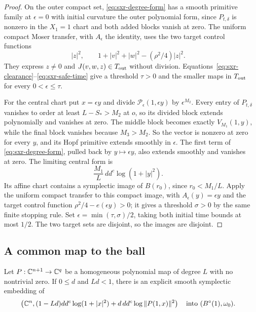 \begin{proof}
On the outer compact set, \eqref{eq:sxr-degree-form} has a smooth primitive family at $\epsilon=0$
with initial curvature the outer polynomial form, since $P_{t,\delta}$ is nonzero in the $X_1=1$
chart and both added blocks vanish at zero. The uniform compact Moser transfer, with $A_\epsilon$ the identity,
uses the two target control functions
\[
 |z|^2,\qquad 1+|v|^2+|w|^2-(\rho^2/4)|z|^2.
\]
They express $z\ne0$ and $J(v,w,z)\in T_{\rm out}$ without division.
Equations~\eqref{eq:sxr-clearance}--\eqref{eq:sxr-safe-time} give a threshold
$\tau>0$ and the smaller maps in $T_{\rm out}$ for every $0<\epsilon\le\tau$.

For the central chart put $x=\epsilon y$ and divide $\mathcal P_\epsilon(1,\epsilon y)$ by $\epsilon^{M_2}$.
Every entry of $P_{t,\delta}$ vanishes to order at least $L-S_*>M_2$ at $o$,
so its divided block extends polynomially and vanishes at zero.
The middle block becomes exactly $V_{M_1}(1,y)$, while the final block vanishes because
$M_3>M_2$. So the vector is nonzero at zero for every $y$, and its Hopf primitive extends
smoothly in $\epsilon$. The first term of \eqref{eq:sxr-degree-form}, pulled back by $y\mapsto\epsilon y$,
also extends smoothly and vanishes at zero.
The limiting central form is
\[
 \frac{M_1}L\,dd^c\log(1+|y|^2).
\]
Its affine chart contains a symplectic image of $B(r_0)$, since $r_0<M_1/L$.
Apply the uniform compact transfer to this compact image, with
$A_\epsilon(y)=\epsilon y$ and the target control function
$\rho^2/4-e(\epsilon y)>0$; it gives a threshold $\sigma>0$ by the same finite
stopping rule. Set $\epsilon=\min(\tau,\sigma)/2$, taking both initial time bounds
at most $1/2$. The two target sets are disjoint, so the images are disjoint.
\end{proof}

\subsection{A common map to the ball}\label{sec:sxr-shell}

\begin{lemma}\label{lem:sxr-shell}
Let $P:\mathbb{C}^{n+1}\to\mathbb{C}^q$ be a homogeneous polynomial map of degree $L$ with no nontrivial zero. If $0\le d$ and $Ld<1$, there is an explicit smooth symplectic
embedding of
\[
 \left(\mathbb{C}^n,(1-Ld)dd^c\log(1+|x|^2)+d\,dd^c\log\|P(1,x)\|^2\right)
 \quad\hbox{into }(B^{\circ}(1),\omega_0).
\]
\end{lemma}


